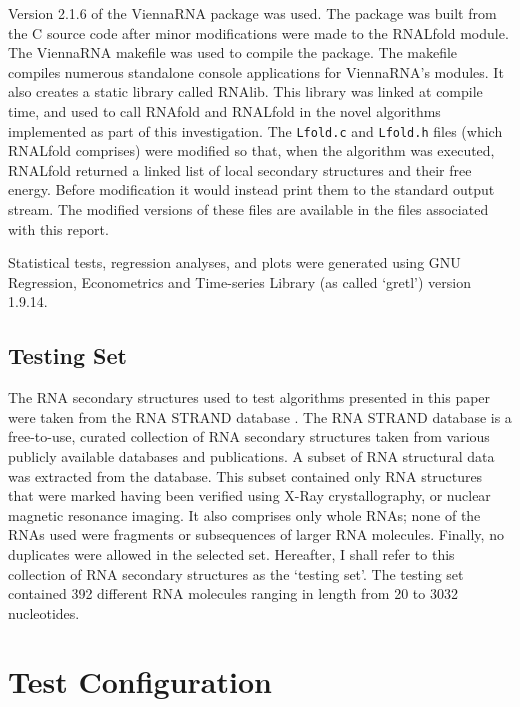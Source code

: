 \documentclass{cshonours}
\begin{document}
Version 2.1.6 of the ViennaRNA package was used. The package was built from the C source code after minor modifications were made to the RNALfold module. The ViennaRNA makefile was used to compile the package. The makefile compiles numerous standalone console applications for ViennaRNA's modules. It also creates a static library called RNAlib. This library was linked at compile time, and used to call RNAfold and RNALfold in the novel algorithms implemented as part of this investigation. The \texttt{Lfold.c} and \texttt{Lfold.h} files (which RNALfold comprises) were modified so that, when the algorithm was executed, RNALfold returned a linked list of local secondary structures and their free energy. Before modification it would instead print them to the standard output stream. The modified versions of these files are available in the files associated with this report.

Statistical tests, regression analyses, and plots were generated using GNU Regression, Econometrics and Time-series Library (as called `gretl') version 1.9.14.


\subsection{Testing Set}
The RNA secondary structures used to test algorithms presented in this paper were taken from the RNA STRAND database \cite{andronescu2008rna}. The RNA STRAND database is a free-to-use, curated collection of RNA secondary structures taken from various publicly available databases and publications. A subset of RNA structural data was extracted from the database. This subset contained only RNA structures that were marked having been verified using X-Ray crystallography, or nuclear magnetic resonance imaging. It also comprises only whole RNAs; none of the RNAs used were fragments or subsequences of larger RNA molecules. Finally, no duplicates were allowed in the selected set. Hereafter, I shall refer to this collection of RNA secondary structures as the `testing set'. The testing set contained 392 different RNA molecules ranging in length from 20 to 3032 nucleotides.




\section{Test Configuration}
\end{document}
